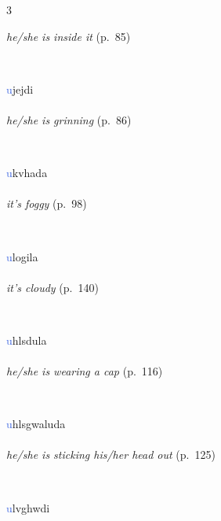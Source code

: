 \documentclass[oneside,openany]{book}%
\begin{document}
\begin{multicols}{3}
\begin{minipage}[t]{\linewidth}
\noindent \textit{he/she is inside it} (p.~85)
\end{minipage}\\[1em]%
\begin{minipage}[t]{\linewidth}
\raggedright\noindent \textcolor{RoyalBlue}{u}jejdi\\
\\
\noindent \textit{he/she is grinning} (p.~86)
\end{minipage}\\[1em]%
\begin{minipage}[t]{\linewidth}
\raggedright\noindent \textcolor{RoyalBlue}{u}kvhada\\
\\
\noindent \textit{it's foggy} (p.~98)
\end{minipage}\\[1em]%
\begin{minipage}[t]{\linewidth}
\raggedright\noindent \textcolor{RoyalBlue}{u}logila\\
\\
\noindent \textit{it's cloudy} (p.~140)
\end{minipage}\\[1em]%
\begin{minipage}[t]{\linewidth}
\raggedright\noindent \textcolor{RoyalBlue}{u}hlsdula\\
\\
\noindent \textit{he/she is wearing a cap} (p.~116)
\end{minipage}\\[1em]%
\begin{minipage}[t]{\linewidth}
\raggedright\noindent \textcolor{RoyalBlue}{u}hlsgwaluda\\
\\
\noindent \textit{he/she is sticking his/her head out} (p.~125)
\end{minipage}\\[1em]%
\begin{minipage}[t]{\linewidth}
\raggedright\noindent \textcolor{RoyalBlue}{u}lvghwdi\\
\\

\end{minipage}
\end{multicols}
\end{document}
